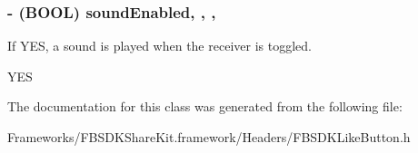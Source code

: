 \subsubsection[{sound\+Enabled}]{\setlength{\rightskip}{0pt plus 5cm}-\/ (B\+O\+O\+L) sound\+Enabled\hspace{0.3cm}{\ttfamily [read]}, {\ttfamily [write]}, {\ttfamily [nonatomic]}, {\ttfamily [assign]}}\label{interface_f_b_s_d_k_like_button_ab7c25ce02e165da8ebd690c2348594ee}
If Y\+E\+S, a sound is played when the receiver is toggled.

Y\+E\+S 

The documentation for this class was generated from the following file\+:\begin{DoxyCompactItemize}
\item 
Frameworks/\+F\+B\+S\+D\+K\+Share\+Kit.\+framework/\+Headers/F\+B\+S\+D\+K\+Like\+Button.\+h\end{DoxyCompactItemize}
